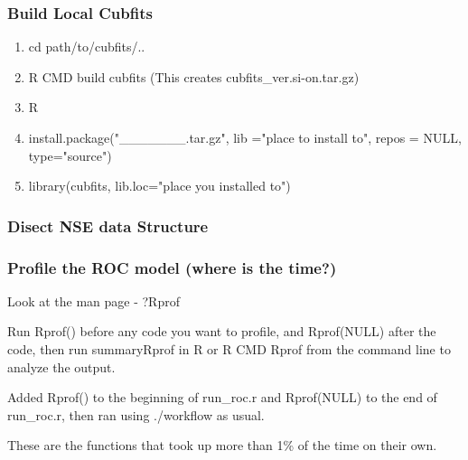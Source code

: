 \documentclass[11pt]{article} %
\begin{document}
\subsubsection{Build Local Cubfits}

\begin{enumerate}
\item cd path/to/cubfits/..
\item R CMD build cubfits (This creates cubfits\_ver.si-on.tar.gz)
\item R
\item install.package("\_\_\_\_\_\_\_.tar.gz", lib ="place to install to", repos = NULL, type="source")
\item library(cubfits, lib.loc="place you installed to")
\end{enumerate}


\subsubsection{Disect NSE data Structure}

\subsubsection{Profile the ROC model (where is the time?)}
Look at the man page - ?Rprof 

Run Rprof() before any code you want to profile, and Rprof(NULL) after the code, then run summaryRprof in R or R CMD Rprof from the command line to analyze the output. 

Added Rprof() to the beginning of run\_roc.r and Rprof(NULL) to the end of run\_roc.r, then ran using ./workflow as usual.

These are the functions that took up more than 1\% of the time on their own.

\end{document}
